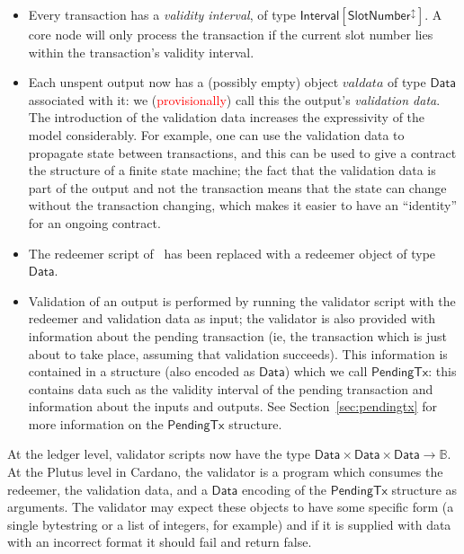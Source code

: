 \documentclass[a4paper]{article}
\newcommand{\red}[1]{\textcolor{red}{#1}}
\newcommand{\s}{\textsf}  %
\newcommand{\false}{\textsf{false}}
\newcommand{\Interval}[1]{\ensuremath{\s{Interval}[#1]}}
\newcommand{\extended}[1]{#1^\updownarrow}
\newcommand{\ptx}{\ensuremath{\s{PendingTx}}}
\newcommand{\mi}[1]{\ensuremath{\mathit{#1}}}
\newcommand{\valdata}{\mi{valdata}}
\newcommand{\Data}{\ensuremath{\mathsf{Data}}}
\newcommand{\msf}[1]{\ensuremath{\mathsf{#1}}}
\newcommand{\slotnum}{\msf{SlotNumber}}
\newcommand\B{\ensuremath{\mathbb{B}}}
\begin{document}
\begin{itemize}
\item Every transaction has a \textit{validity interval}, of type $\Interval{\extended{\slotnum}}$.
  A core node will only process the transaction if
  the current slot number lies within the transaction's validity
  interval.

\item Each unspent output now has a (possibly empty) object $\valdata$ of type
  \Data{} associated with it: we (\red{provisionally}) call this the output's
  \textit{validation data}.  The introduction of the validation data
  increases the expressivity of the model considerably. For example,
  one can use the validation data to propagate state between
  transactions, and this can be used to give a contract the structure
  of a finite state machine; the fact that the validation data is part
  of the output and not the transaction means that the state can
  change without the transaction changing, which makes it easier to
  have an ``identity'' for an ongoing contract.

\item The redeemer script of~\citet{Zahnentferner18-UTxO} has been
  replaced with a redeemer object of type \Data.

\item Validation of an output is performed by running the validator
  script with the redeemer and validation data as input; the validator
  is also provided with information about the pending transaction (ie,
  the transaction which is just about to take place, assuming that
  validation succeeds). This information is contained in a structure
  (also encoded as \Data) which we call \ptx{}: this contains data
  such as the validity interval of the pending transaction and
  information about the inputs and outputs.  See
  Section~\ref{sec:pendingtx} for more information on the \ptx{}
  structure.

\end{itemize}


\noindent At the ledger level, validator scripts now have the type
$
\Data \times \Data \times \Data \rightarrow \B
$. At the Plutus level in Cardano, the validator is a program which
consumes the redeemer, the validation data, and a \Data{} encoding
of the \ptx{} structure as arguments.  The validator may
expect these objects to have some specific form (a single bytestring
or a list of integers, for example) and if it is supplied with data
with an incorrect format it should fail and return \false.
\end{document}
